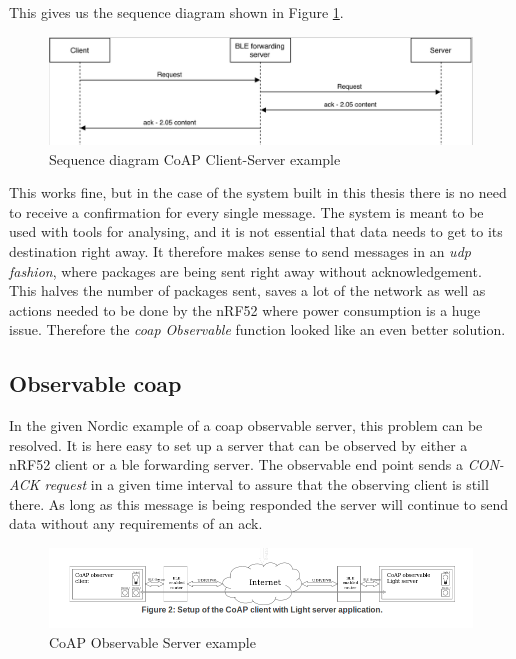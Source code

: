 This gives us the sequence diagram shown in Figure \ref{fig:seq1}. 

\begin{figure}[h]
    \centering
    \includegraphics[scale=0.27]{seq1.png}    
    \caption{Sequence diagram CoAP Client-Server example}
    \label{fig:seq1}
\end{figure}

This works fine, but in the case of the system built in this thesis there is no need to receive a confirmation for every single message. The system is meant to be used with tools for analysing, and it is not essential that data needs to get to its destination right away. It therefore makes sense to send messages in an \textit{\gls{udp} fashion}, where packages are being sent right away without acknowledgement. This halves the number of packages sent, saves a lot of the network as well as actions needed to be done by the nRF52 where power consumption is a huge issue. Therefore the \textit{\gls{coap} Observable} function looked like an even better solution.   

\subsection{Observable \gls{coap}}

In the given Nordic example of a \gls{coap} observable server, this problem can be resolved. It is here easy to set up a server that can be observed by either a nRF52 client or a \gls{ble} forwarding server. The observable end point sends a \textit{CON-ACK request} in a given time interval to assure that the observing client is still there. As long as this message is being responded the server will continue to send data without any requirements of an \gls{ack}. 

\begin{figure}[h]
    \centering
    \includegraphics[scale=0.47]{CoAPObservalbFigure2.png}    
    \caption{CoAP Observable Server example}
    \label{fig:CoAPexample1}
\end{figure}



